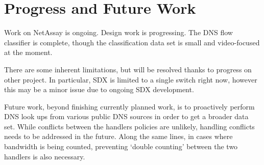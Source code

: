 \documentclass{sig-alternate}
\newcommand\tti[1]{\small\texttt{#1}\normalsize}
\newcommand\system{NetAssay}
\begin{document}





\section{Progress and Future Work}
Work on \system{} is ongoing. Design work is progressing. The DNS flow classifier is complete, though the classification data set is small and video-focused at the moment. 

There are some inherent limitations, but will be resolved thanks to progress on other project. In particular, SDX is limited to a single switch right now, however this may be a minor issue due to ongoing SDX development.


Future work, beyond finishing currently planned work, is to proactively perform DNS look ups from various public DNS sources in order to get a broader data set. While conflicts between the handlers policies are unlikely, handling conflicts needs to be addressed in the future. Along the same lines, in cases where bandwidth is being counted, preventing `double counting' between the two handlers is also necessary.
\end{document}
